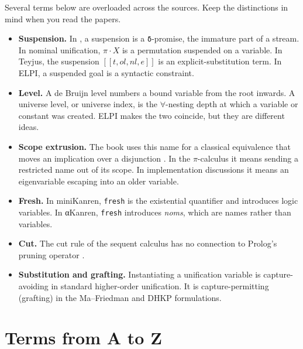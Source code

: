 \begin{pitfall}
Several terms below are overloaded across the sources. Keep the distinctions in mind when you read the papers.
\begin{itemize}[nosep]
\item \textbf{Suspension.} In \micro{}, a suspension is a \texttt{δ}-promise, the immature part of a stream. In
  nominal unification, $\pi\cdot X$ is a permutation suspended on a variable. In Teyjus, the suspension
  $[[t,ol,nl,e]]$ is an explicit-substitution term. In ELPI, a suspended goal is a syntactic constraint.
\item \textbf{Level.} A de Bruijn level numbers a bound variable from the root inwards. A universe level, or
  universe index, is the $\forall$-nesting depth at which a variable or constant was created. ELPI makes the two
  coincide, but they are different ideas.
\item \textbf{Scope extrusion.} The book uses this name for a classical equivalence that moves an implication over
  a disjunction . In the $\pi$-calculus it means sending a restricted name out of its scope. In
  implementation discussions it means an eigenvariable escaping into an older variable.
\item \textbf{Fresh.} In miniKanren, \texttt{fresh} is the existential quantifier and introduces logic variables.
  In αKanren, \texttt{fresh} introduces \emph{noms}, which are names rather than variables.
\item \textbf{Cut.} The cut rule of the sequent calculus has no connection to Prolog's pruning operator \lp{!}
  .
\item \textbf{Substitution and grafting.} Instantiating a unification variable is capture-avoiding in standard
  higher-order unification. It is capture-permitting (grafting) in the Ma--Friedman and DHKP formulations.
\end{itemize}
\end{pitfall}

\section{Terms from A to Z}\label{sec:glossary-az}

\begingroup\sloppy

